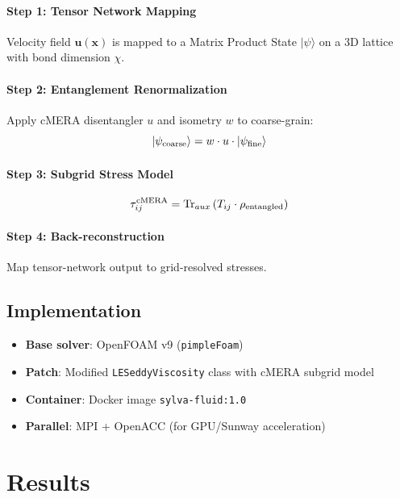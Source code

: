 \documentclass[jfm]{elsarticle}
\begin{document}
\paragraph{Step 1: Tensor Network Mapping}
Velocity field $\mathbf{u}(\mathbf{x})$ is mapped to a Matrix Product State $|\psi\rangle$ on a 3D lattice with bond dimension $\chi$.

\paragraph{Step 2: Entanglement Renormalization}
Apply cMERA disentangler $u$ and isometry $w$ to coarse-grain:
\begin{equation}
|\psi_{\rm coarse}\rangle = w \cdot u \cdot |\psi_{\rm fine}\rangle
\end{equation}

\paragraph{Step 3: Subgrid Stress Model}
\begin{equation}
\tau_{ij}^{\rm cMERA} = \mathrm{Tr}_{aux}\left(T_{ij} \cdot \rho_{\rm entangled}\right)
\end{equation}

\paragraph{Step 4: Back-reconstruction}
Map tensor-network output to grid-resolved stresses.

\subsection{Implementation}
\begin{itemize}
\item \textbf{Base solver}: OpenFOAM v9 (\texttt{pimpleFoam})
\item \textbf{Patch}: Modified \texttt{LESeddyViscosity} class with cMERA subgrid model
\item \textbf{Container}: Docker image \texttt{sylva-fluid:1.0}
\item \textbf{Parallel}: MPI + OpenACC (for GPU/Sunway acceleration)
\end{itemize}

\section{Results}
\label{sec:results}
\end{document}
